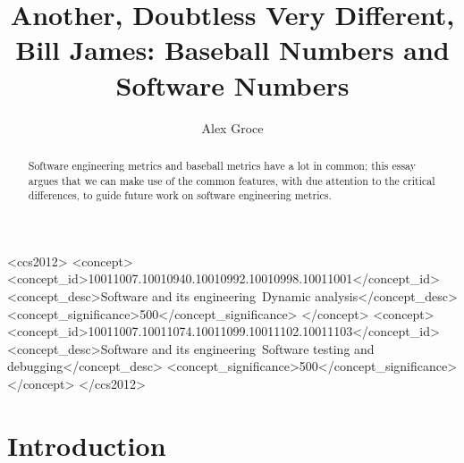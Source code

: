 \documentclass[sigplan,screen]{acmart}
\begin{document}
\title{Another, Doubtless Very Different, Bill James: Baseball Numbers
and Software Numbers}

\author{Alex Groce}

\renewcommand{\shortauthors}{Alex Groce}

\begin{CCSXML}
<ccs2012>
<concept>
<concept_id>10011007.10010940.10010992.10010998.10011001</concept_id>
<concept_desc>Software and its engineering~Dynamic analysis</concept_desc>
<concept_significance>500</concept_significance>
</concept>
<concept>
<concept_id>10011007.10011074.10011099.10011102.10011103</concept_id>
<concept_desc>Software and its engineering~Software testing and debugging</concept_desc>
<concept_significance>500</concept_significance>
</concept>
</ccs2012>
\end{CCSXML}





\begin{abstract}
Software engineering metrics and baseball metrics have a lot in
common; this essay argues that we can make use of the common features,
with due attention to the critical differences, to guide future work on software
engineering metrics.
  \end{abstract}



\maketitle

\section{Introduction}
\end{document}

